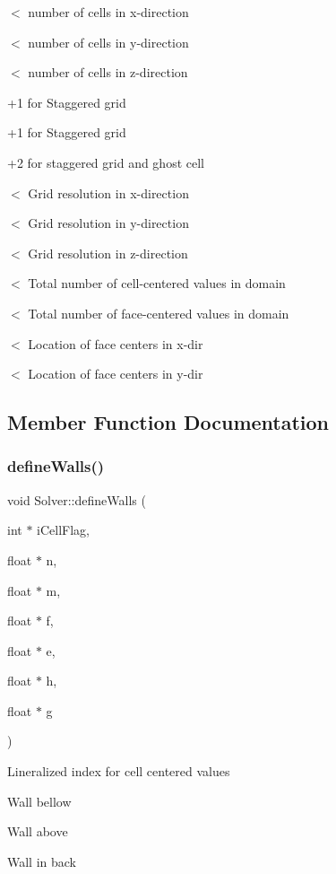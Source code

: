$<$ number of cells in x-\/direction

$<$ number of cells in y-\/direction

$<$ number of cells in z-\/direction

+1 for Staggered grid

+1 for Staggered grid

+2 for staggered grid and ghost cell

$<$ Grid resolution in x-\/direction

$<$ Grid resolution in y-\/direction

$<$ Grid resolution in z-\/direction

$<$ Total number of cell-\/centered values in domain

$<$ Total number of face-\/centered values in domain

$<$ Location of face centers in x-\/dir

$<$ Location of face centers in y-\/dir 

\subsection{Member Function Documentation}
\mbox{\label{classSolver_a66fa054cbf52fd6c184386fe11f9cadf}} 
\subsubsection{\texorpdfstring{define\+Walls()}{defineWalls()}}
{\footnotesize\ttfamily void Solver\+::define\+Walls (\begin{DoxyParamCaption}\item[{int $\ast$}]{i\+Cell\+Flag,  }\item[{float $\ast$}]{n,  }\item[{float $\ast$}]{m,  }\item[{float $\ast$}]{f,  }\item[{float $\ast$}]{e,  }\item[{float $\ast$}]{h,  }\item[{float $\ast$}]{g }\end{DoxyParamCaption})}

Lineralized index for cell centered values

Wall bellow

Wall above

Wall in back

